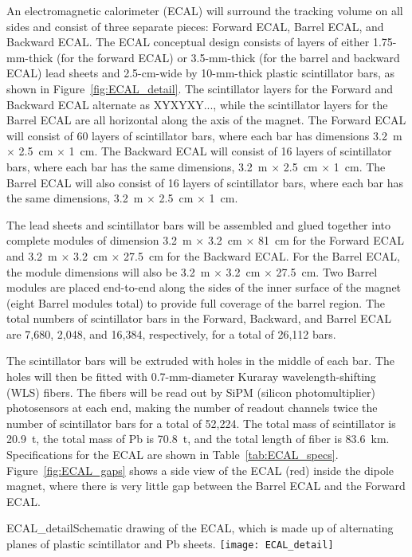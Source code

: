 An electromagnetic calorimeter 
(ECAL) will surround the tracking volume on all sides and consist of three separate pieces: Forward ECAL, Barrel ECAL, and Backward ECAL.  
The ECAL conceptual design 
consists of 
layers of either 1.75-mm-thick (for the forward ECAL) or 3.5-mm-thick 
(for the barrel and backward ECAL) lead sheets and 2.5-cm-wide by 10-mm-thick 
plastic scintillator bars,
as shown in Figure~\ref{fig:ECAL_detail}. The scintillator layers for the
Forward and Backward ECAL alternate as XYXYXY..., while the scintillator 
layers for the Barrel ECAL are all horizontal along the axis of the magnet.
The Forward ECAL will consist of 60 layers of scintillator bars, where each
bar has dimensions 3.2~m $\times$ 2.5~cm $\times$ 1~cm. The
Backward ECAL will consist of 16 layers of scintillator bars, where each 
bar has the same dimensions, 3.2~m $\times$ 2.5~cm $\times$ 1~cm. The Barrel ECAL will also consist 
of 16 layers of scintillator bars, where each bar has the same dimensions, 
3.2~m $\times$ 2.5~cm $\times$ 1~cm. 

The lead sheets and scintillator bars will be assembled and glued together
into complete modules of dimension 
3.2~m $\times$ 3.2~cm $\times$ 81~cm for the Forward ECAL and
3.2~m $\times$ 3.2~cm $\times$ 27.5~cm for the Backward ECAL. For the Barrel ECAL, the module 
dimensions will also be 
3.2~m $\times$ 3.2~cm $\times$ 27.5~cm. Two Barrel modules are placed end-to-end 
along the sides of the inner surface of the magnet (eight Barrel modules
total) to provide full coverage of the barrel region.
The total numbers of scintillator bars in the
Forward, Backward, and Barrel ECAL are 7,680, 2,048, and 16,384, respectively, 
for a total of 26,112 bars. 

The scintillator bars will be extruded with 
holes in the middle of each bar. The
holes will then be fitted with 0.7-mm-diameter Kuraray wavelength-shifting (WLS) fibers.
The fibers will be read out by SiPM (silicon photomultiplier) photosensors at each end, making the number of 
readout channels twice the number of scintillator bars 
for a total of 52,224. The total mass of scintillator is 20.9~t, 
the total mass of Pb is 70.8~t, and
the total length of fiber is 83.6~km.
Specifications for the ECAL are shown in Table~\ref{tab:ECAL_specs}.  
Figure~\ref{fig:ECAL_gaps} shows a side view of the ECAL (red) inside the dipole
magnet, where there is very little gap between the Barrel ECAL and the Forward ECAL.


\begin{cdrfigure}{ECAL_detail}{Schematic drawing of the ECAL, which is made up of alternating planes
of plastic scintillator and Pb sheets.}
\texttt{[image: ECAL\_detail]}
\end{cdrfigure}



